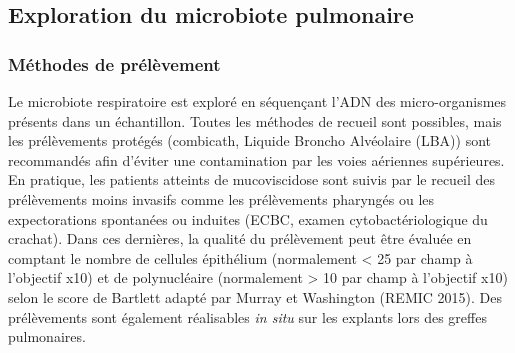 \documentclass[12pt,a4paper]{article}
\begin{document}
\subsection{Exploration du microbiote pulmonaire}

\subsubsection{Méthodes de prélèvement}
Le microbiote respiratoire est exploré en séquençant l'ADN des micro-organismes présents dans un échantillon.
Toutes les méthodes de recueil sont possibles, mais les prélèvements protégés (combicath, Liquide Broncho Alvéolaire (LBA)) sont recommandés afin
d’éviter une contamination par les voies aériennes supérieures. En pratique, les patients atteints de mucoviscidose sont suivis par le recueil des prélèvements moins invasifs comme les prélèvements pharyngés ou les expectorations spontanées ou induites (ECBC, examen cytobactériologique du crachat). Dans ces dernières, la qualité du prélèvement peut être évaluée en comptant le nombre de cellules épithélium (normalement < 25 par champ à l'objectif x10) et de polynucléaire (normalement > 10 par champ à l'objectif x10) selon le score de Bartlett adapté par Murray et Washington (REMIC 2015). Des prélèvements sont également réalisables \textit{in situ}  sur les explants lors des greffes pulmonaires.
\end{document}
